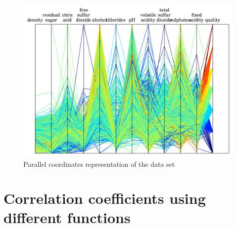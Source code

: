 \documentclass{report}
\begin{document}
\begin{figure}[H]
\includegraphics[width=\textwidth]{parallel_coords.png}
\caption{Parallel coordinates representation of the data set}\n\end{figure}

\section{Correlation coefficients using different functions}
\end{document}
